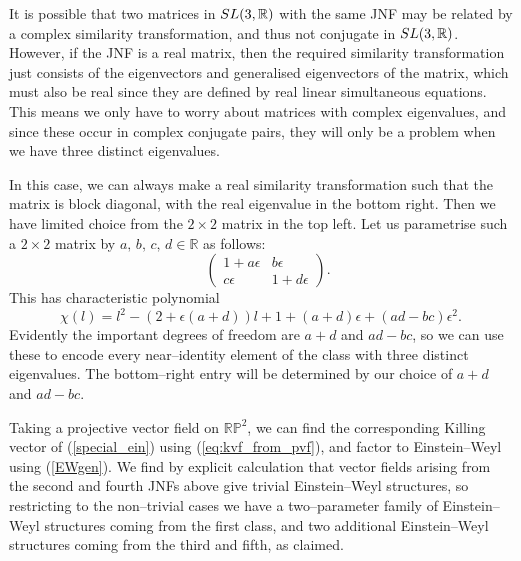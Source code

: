 It is possible that two matrices in $SL(3,\mathbb{R})$ with the same JNF may be related by a complex similarity transformation, and thus not conjugate in $SL(3,\mathbb{R})$. However, if the JNF is a real matrix, then the required similarity transformation just consists of the eigenvectors and generalised eigenvectors of the matrix, which must also be real since they are defined by real linear simultaneous equations. This means we only have to worry about matrices with complex eigenvalues, and since these occur in complex conjugate pairs, they will only be a problem when we have three distinct eigenvalues.

In this case, we can always make a real similarity transformation such that the matrix is block diagonal, with the real eigenvalue in the bottom right. Then we have limited choice from the $2\times 2$ matrix in the top left. Let us parametrise such a $2\times 2$ matrix by $a,\,b,\,c,\,d\in\mathbb{R}$ as follows:
\[
\quad
\begin{pmatrix}1+a\epsilon & b\epsilon \\
c\epsilon & 1+d\epsilon 
\end{pmatrix}.
\]
This has characteristic polynomial
\[
\chi( l)= l^2-(2+\epsilon(a+d)) l+1+(a+d)\epsilon+(ad-bc)\epsilon^2.
\]
Evidently the important degrees of freedom are $a+d$ and $ad-bc$, so we can use these to encode every near--identity element of the class with three distinct eigenvalues. The bottom--right entry will be determined by our choice of $a+d$ and $ad-bc$.

Taking a projective vector field on $\mathbb{RP}^2$, we can find the corresponding Killing vector of (\ref{special_ein}) using (\ref{eq:kvf_from_pvf}), and factor to Einstein--Weyl using (\ref{EWgen}). We find by explicit calculation that vector fields arising from the second and fourth JNFs above give trivial Einstein--Weyl structures, so restricting to the non--trivial cases we have a two--parameter family of Einstein--Weyl structures coming from the first class, and two additional Einstein--Weyl structures coming from the third and fifth, as claimed.
\koniec



